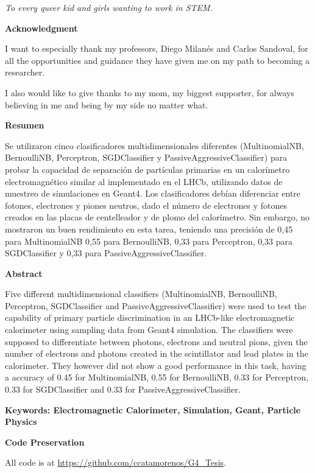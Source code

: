 
\begin{flushright}
\begin{minipage}{8cm}
    \noindent
        \small
        \textit{To every queer kid and girls wanting to work in STEM.}
\end{minipage}
\end{flushright}

\newpage{\pagestyle{empty}}

\newpage
\thispagestyle{empty} \textbf{}\normalsize


\textbf{\LARGE Acknowledgment}

I want to especially thank my professors, Diego Milanés and Carlos Sandoval,
for all the opportunities and guidance they have given me on my path to
becoming a researcher.

I also would like to give thanks to my mom, my biggest supporter, for always
believing in me and being by my side no matter what.

\newpage{\pagestyle{empty}\cleardoublepage}

\newpage
\textbf{\LARGE Resumen}

Se utilizaron cinco clasificadores multidimensionales diferentes
(MultinomialNB, BernoulliNB, Perceptron, SGDClassifier y
PassiveAggressiveClassifier) para probar la capacidad de separación de
partículas primarias en un calorímetro electromagnético similar al implementado
en el LHCb, utilizando datos de muestreo de simulaciones en Geant4. Los
clasificadores debían diferenciar entre fotones, electrones y piones neutros,
dado el número de electrones y fotones creados en las placas de centelleador y
de plomo del calorímetro. Sin embargo, no mostraron un buen rendimiento en esta
tarea, teniendo una precisión de 0,45 para MultinomialNB 0,55 para BernoulliNB,
0,33 para Perceptron, 0,33 para SGDClassifier y 0,33 para
PassiveAggressiveClassifier.

\textbf{\LARGE Abstract}


Five different multidimensional classifiers (MultinomialNB, BernoulliNB,
Perceptron, SGDClassifier and PassiveAggressiveClassifier) were used to test
the capability of primary particle discrimination in an LHCb-like
electromagnetic calorimeter using sampling data from Geant4 simulation. The
classifiers were supposed to differentiate between photons, electrons and
neutral pions, given the number of electrons and photons created in the
scintillator and lead plates in the calorimeter. They however did not show a
good performance in this task, having a accuracy of 0.45 for MultinomialNB,
0.55 for BernoulliNB, 0.33 for Perceptron, 0.33 for SGDClassifier and 0.33 for
PassiveAggressiveClassifier.

\textbf{\small Keywords: Electromagnetic Calorimeter, Simulation, Geant, Particle Physics}\\

\newpage{}

\textbf{\LARGE Code Preservation}

All code is at \url{https://github.com/ccatamorenos/G4_Tesis}.
